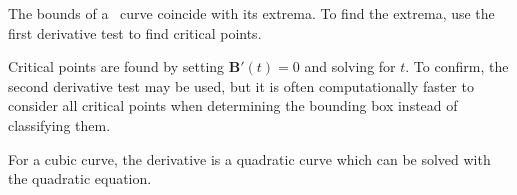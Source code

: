 \documentclass[oneside,usepdftitle=true]{article}
\begin{document}
The bounds of a \Bezier\ curve coincide with its extrema.  To find the extrema, use the first derivative test to find critical points.

Critical points are found by setting $\mathbf{B}'(t) = 0$ and solving for $t$.  To confirm, the second derivative test may be used, but it is often computationally faster to consider all critical points when determining the bounding box instead of classifying them.

For a cubic curve, the derivative is a quadratic curve which can be solved with the quadratic equation.

\newpage
\nocite{cs-lecture,bez-paper} %



\end{document}
